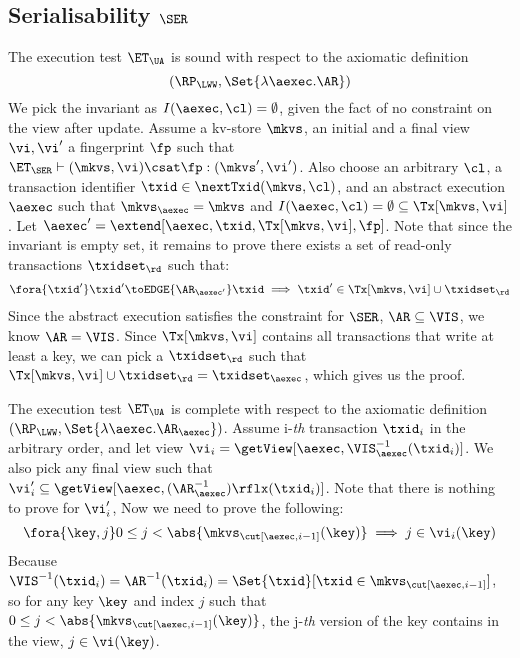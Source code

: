 \subsection{Serialisability \( \SER \)}
\label{sec:sound-complete-ser}

The execution test $\ET_\UA$ is sound with respect to the axiomatic definition 
\[ 
    (\RP_{\LWW}, \Set{\lambda \aexec. \AR })
\]
We pick the invariant as \( I( \aexec, \cl ) = \emptyset \), given the fact of no constraint on the view after update.
Assume a kv-store $\mkvs$, an initial and a final view $\vi, \vi'$  a fingerprint $\fp$ 
such that $\ET_{\SER} \vdash (\mkvs, \vi) \csat \fp: (\mkvs',\vi')$. 
Also choose an arbitrary $\cl$, a transaction identifier $\txid \in \nextTxid(\mkvs, \cl)$, 
and an abstract execution $\aexec$ such that $\mkvs_{\aexec} = \mkvs$ and 
\( I(\aexec, \cl) =  \emptyset \subseteq \Tx[\mkvs, \vi] \).
Let \( \aexec' = \extend[\aexec, \txid, \Tx[\mkvs, \vi], \fp] \).
Note that since the invariant is empty set, it remains to prove there exists a set of read-only transactions \( \txidset_\rd \) such that:
\[
    \begin{array}{@{}l@{}}
        \fora{ \txid' } 
        \txid' \toEDGE{\AR_{\aexec'}} \txid \implies \txid' \in \Tx[\mkvs, \vi] \cup \txidset_\rd
    \end{array}
\]
Since the abstract execution satisfies the constraint for \( \SER \), \ie \( \AR \subseteq \VIS \), we know \( \AR = \VIS \).
Since \( \Tx[\mkvs, \vi]  \) contains all transactions that write at least a key, 
we can pick a \( \txidset_\rd \) such that \( \Tx[\mkvs, \vi] \cup \txidset_\rd = \txidset_\aexec\),
which gives us the proof.


The execution test $\ET_\UA$ is complete with respect to the axiomatic definition \( (\RP_{\LWW}, \Set{\lambda \aexec. \AR_\aexec }) \).
Assume i-\emph{th} transaction \( \txid_i \) in the arbitrary order,
and let view \( \vi_{i} = \getView[\aexec, \VIS^{-1}_{\aexec}(\txid_{i})] \).
We also pick any final view such that \( \vi'_{i} \subseteq \getView[\aexec, (\AR^{-1}_{\aexec})\rflx(\txid_{i})] \).
Note that there is nothing to prove for \( \vi'_i \),
Now we need to prove the following:
\[
    \fora{\key, j}  0 \leq j < \abs{\mkvs_{\cut[\aexec, i-1]}(\key)} \implies j \in \vi_i(\key)
\]
Because \( \VIS^{-1}(\txid_i) = \AR^{-1}(\txid_i) = \Set{\txid }[\txid \in \mkvs_{\cut[\aexec, i-1]} ]\),
so for any key \( \key \) and index \( j \) such that \( 0 \leq j < \abs{\mkvs_{\cut[\aexec, i-1]}(\key)} \),
the j-\emph{th} version of the key contains in the view, \ie \( j \in \vi(\key)\).

